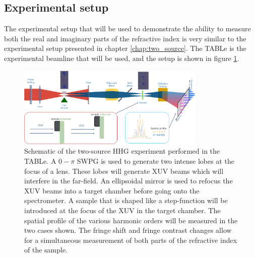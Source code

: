 \subsection{Experimental setup}
\label{sec:experimental_setup_refrac}
The experimental setup that will be used to demonstrate the ability to measure both the real and imaginary parts of the refractive index is very similar to the experimental setup presented in chapter \ref{chap:two_source}.  The TABLe is the experimental beamline that will be used, and the setup is shown in figure \ref{fig:refract_schematic}.
\begin{figure}
	\centering
	\includegraphics[width=0.8\textwidth]{figures/refractive_index/experimental_setup.png}
	\caption[Schematic of using two-source HHG to measure the real and imaginary part of the refractive index]{Schematic of the two-source HHG experiment performed in the TABLe. A $0-\pi$ SWPG is used to generate two intense lobes at the focus of a lens.  These lobes will generate XUV beams which will interfere in the far-field.  An ellipsoidal mirror is used to refocus the XUV beams into a target chamber before going onto the spectrometer. A sample that is shaped like a step-function will be introduced at the focus of the XUV in the target chamber.  The spatial profile of the various harmonic orders will be measured in the two cases shown.  The fringe shift and fringe contrast changes allow for a simultaneous measurement of both parts of the refractive index of the sample.}
	\label{fig:refract_schematic}
\end{figure}


